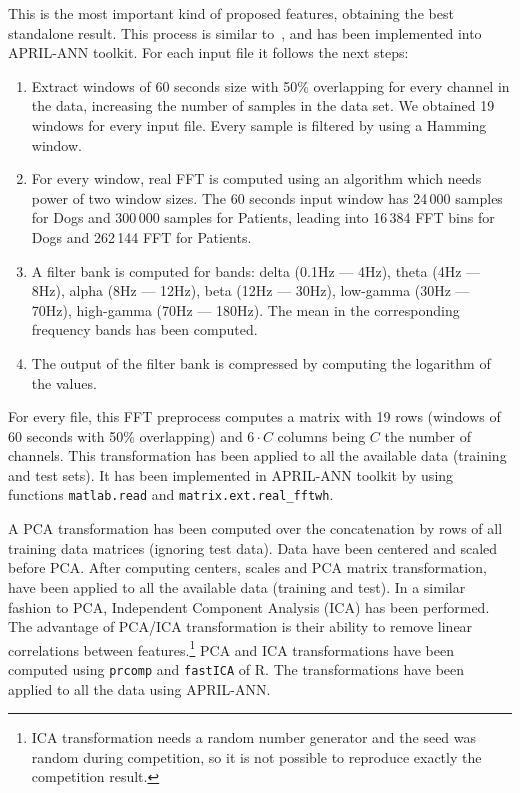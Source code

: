 \documentclass[a4paper,english,twoside]{article}
\begin{document}
This is the most important kind of proposed features, obtaining the best
standalone result. This process is similar to~\cite{2014:howbert:plosone}, and
has been implemented into APRIL-ANN toolkit. For each input file it follows
the next steps:

\begin{enumerate}
\item
  Extract windows of 60 seconds size with 50\% overlapping for every
  channel in the data, increasing the number of samples in the data set.
  We obtained 19 windows for every input file. Every sample is filtered
  by using a Hamming window.
\item
  For every window, real FFT is computed using an algorithm which needs power of
  two window sizes. The 60 seconds input window has 24\,000 samples for Dogs and
  300\,000 samples for Patients, leading into 16\,384 FFT bins for Dogs and
  262\,144 FFT for Patients.
\item A filter bank is computed for bands: delta (0.1Hz --- 4Hz), theta (4Hz ---
  8Hz), alpha (8Hz --- 12Hz), beta (12Hz --- 30Hz), low-gamma (30Hz --- 70Hz),
  high-gamma (70Hz --- 180Hz). The mean in the corresponding frequency bands has
  been computed.
\item
  The output of the filter bank is compressed by computing the logarithm
  of the values.
\end{enumerate}

For every file, this FFT preprocess computes a matrix with 19 rows (windows of
60 seconds with 50\% overlapping) and $6 \cdot C$ columns being $C$ the number of
channels. This transformation has been applied to all the available data
(training and test sets). It has been implemented in APRIL-ANN toolkit by using
functions \verb+matlab.read+ and \verb+matrix.ext.real_fftwh+.

A PCA transformation has been computed over the concatenation by rows of all
training data matrices (ignoring test data). Data have been centered and scaled
before PCA. After computing centers, scales and PCA matrix transformation,
have been applied to all the available data (training and test). In a similar
fashion to PCA, Independent Component Analysis (ICA) has been performed. The
advantage of PCA/ICA transformation is their ability to remove linear
correlations between features.\footnote{ICA transformation needs a random number
  generator and the seed was random during competition, so it is not possible to
  reproduce exactly the competition result.} PCA and ICA transformations have
been computed using \verb+prcomp+ and \verb+fastICA+ of R. The
transformations have been applied to all the data using APRIL-ANN.
\end{document}
